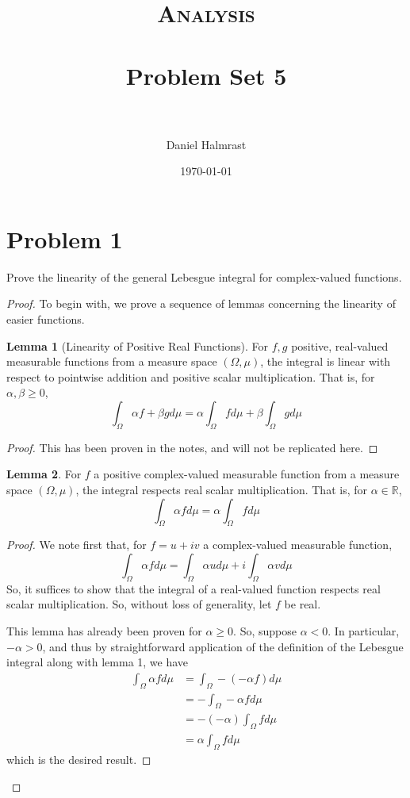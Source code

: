 \documentclass[fontsize=11pt]{scrartcl} %
\title{	
\normalfont \normalsize 
\textsc{Analysis} \\ [25pt] %
\horrule{0.5pt} \\[0.4cm] %
\huge Problem Set 5\\ %
\horrule{2pt} \\[0.5cm] %
}
\author{Daniel Halmrast} %
\date{\normalsize\today} %
\numberwithin{equation}{section} %
\numberwithin{figure}{section} %
\numberwithin{table}{section} %
\newcommand{\R}{\mathbb{R}}
\theoremstyle{definition}
\newtheorem{lemma}{Lemma}
\begin{document}
\maketitle %

\section*{Problem 1}
Prove the linearity of the general Lebesgue integral for complex-valued functions.
\\
\begin{proof}
To begin with, we prove a sequence of lemmas concerning the linearity of easier functions.
\begin{lemma}[Linearity of Positive Real Functions]
For $f,g$ positive, real-valued measurable functions from a measure space $(\Omega,\mu)$,
the integral is linear with respect to pointwise addition and positive scalar
multiplication. That is, for $\alpha, \beta \geq 0$,
\[
\int_{\Omega} \alpha f + \beta g d\mu = \alpha\int_{\Omega} fd\mu + \beta\int_{\Omega} gd\mu
\]
\end{lemma}
\begin{proof}
This has been proven in the notes, and will not be replicated here.
\end{proof}

\begin{lemma}
For $f$ a positive complex-valued measurable function from a measure space $(\Omega,\mu)$,
the integral respects real scalar multiplication. That is, for $\alpha\in\R$, 
\[
\int_{\Omega}\alpha fd\mu = \alpha\int_{\Omega} fd\mu
\]
\end{lemma}
\begin{proof}
We note first that, for $f = u+iv$ a complex-valued measurable function,
\[
\int_{\Omega}\alpha fd\mu = \int_{\Omega}\alpha ud\mu +i\int_{\Omega}\alpha vd\mu
\]
So, it suffices to show that the integral of a real-valued function respects real
scalar multiplication. So, without loss of generality, let $f$ be real.

This lemma has already been proven for $\alpha\geq 0$. So, suppose $\alpha < 0$.
In particular, $-\alpha > 0$, and thus by straightforward application of the definition of
the Lebesgue integral along with lemma 1, we have
\[
\begin{aligned}
\int_{\Omega}\alpha fd\mu   &= \int_{\Omega}-(-\alpha f)d\mu\\
                            &= -\int_{\Omega}-\alpha fd\mu\\
                            &= -(-\alpha)\int_{\Omega} fd\mu\\
                            &= \alpha\int_{\Omega} fd\mu
\end{aligned}
\]
which is the desired result.
\end{proof}


\end{proof}
\end{document}

